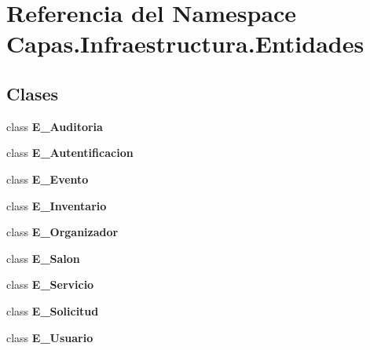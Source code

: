 \section{Referencia del Namespace Capas.\+Infraestructura.\+Entidades}
\label{namespace_capas_1_1_infraestructura_1_1_entidades}
\subsection*{Clases}
\begin{DoxyCompactItemize}
\item 
class {\bf E\+\_\+\+Auditoria}
\item 
class {\bf E\+\_\+\+Autentificacion}
\item 
class {\bf E\+\_\+\+Evento}
\item 
class {\bf E\+\_\+\+Inventario}
\item 
class {\bf E\+\_\+\+Organizador}
\item 
class {\bf E\+\_\+\+Salon}
\item 
class {\bf E\+\_\+\+Servicio}
\item 
class {\bf E\+\_\+\+Solicitud}
\item 
class {\bf E\+\_\+\+Usuario}
\end{DoxyCompactItemize}
